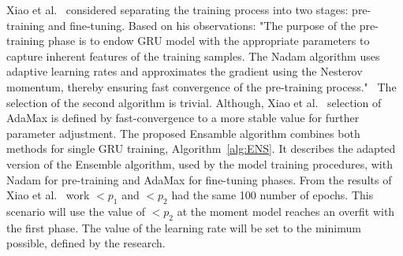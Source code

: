 %
%
Xiao et al.~\cite{xiao_accurate_2019} considered separating the training process into two stages: pre-training and fine-tuning.
Based on his observations: "The purpose of the pre-training phase is to endow GRU model with the appropriate parameters to capture inherent features of the training samples.
The Nadam algorithm uses adaptive learning rates and approximates the gradient using the Nesterov momentum, thereby ensuring fast convergence of the pre-training process."~\cite{xiao_accurate_2019}
The selection of the second algorithm is trivial.
Although, Xiao et al.~\cite{xiao_accurate_2019} selection of AdaMax is defined by fast-convergence to a more stable value for further parameter adjustment.
The proposed Ensamble algorithm combines both methods for single GRU training, \mbox{Algorithm~\ref{alg:ENS}}.
It describes the adapted version of the Ensemble algorithm, used by the model training procedures, with Nadam for pre-training and AdaMax for fine-tuning phases.
From the results of Xiao et al.~\cite{xiao_accurate_2019} work $<p_{1}$ and $<p_{2}$ had the same 100 number of epochs.
This scenario will use the value of $<p_{2}$ at the moment model reaches an overfit with the first phase.
The value of the learning rate will be set to the minimum possible, defined by the research.
